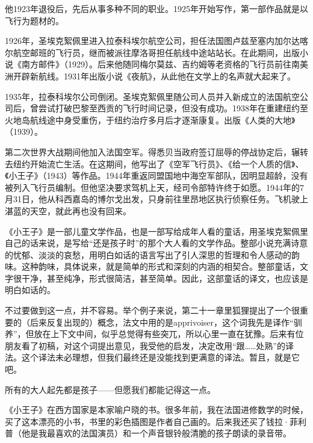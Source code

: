 他1923年退役后，先后从事多种不同的职业。1925年开始写作，第一部作品就是以飞行为题材的。

1926年，圣埃克絮佩里进入拉泰科埃尔航空公司，担任法国图卢兹至塞内加尔达喀尔航空邮班的飞行员，继而被派往摩洛哥担任航线中途站站长。在此期间，出版小说《南方邮件》（1929）。后来他随同梅尔莫兹、吉约姆等老资格的飞行员前往南美洲开辟新航线。1931年出版小说《夜航》，从此他在文学上的名声就大起来了。

1935年，拉泰科埃尔公司倒闭。圣埃克絮佩里随公司人员并入新成立的法国航空公司后，曾尝试打破巴黎至西贡的飞行时间记录，但没有成功。1938年在重建纽约至火地岛航线途中身受重伤，于纽约治疗多月后才逐渐康复。出版《人类的大地》（1939）。

第二次世界大战期间他加入法国空军。得悉贝当政府签订屈辱的停战协定后，辗转去纽约开始流亡生活。在这期间，他写出了《空军飞行员》、《给一个人质的信》、《小王子》（1943）等作品。1944年重返同盟国地中海空军部队，因明显超龄，没有被列入飞行员编制。但他坚决要求驾机上天，经司令部特许终于如愿。1944年的7月31日，他从科西嘉岛的博尔戈出发，只身前往里昂地区执行侦察任务。飞机驶上湛蓝的天空，就此再也没有回来。

《小王子》是一部儿童文学作品，也是一部写给成年人看的童话，用圣埃克絮佩里自己的话来说，是写给“还是孩子时”的那个大人看的文学作品。整部小说充满诗意的忧郁、淡淡的哀愁，用明白如话的语言写出了引人深思的哲理和令人感动的韵味。这种韵味，具体说来，就是简单的形式和深刻的内涵的相契合。整部童话，文字很干净，甚至纯净，形式很简洁，甚至简单。因此，这部童话的译文，也应该是明白如话的。

不过要做到这一点，并不容易。举个例子来说，第二十一章里狐狸提出了一个很重要的（后来反复出现的）概念，法文中用的是apprivoiser，这个词我先是译作“驯养”，但放在上下文中间，似乎总觉得有些突兀，所以心里一直在犹豫。后来有位朋友看了初稿，对这个词提出意见，我受他的启发，决定改用“跟\ldots{}\ldots{}处熟”的译法。这个译法未必理想，但我们最终还是没能找到更满意的译法。暂且，就是它吧。

所有的大人起先都是孩子------但愿我们都能记得这一点。



\stopsubject

\startsubject[title={第二版译序},reference={part0031.html_b002}]

《小王子》在西方国家是本家喻户晓的书。很多年前，我在法国进修数学的时候，买了这本漂亮的小书，书里的彩色插图是作者自己画的。后来我还买了钱拉·菲利普（他是我最喜欢的法国演员）和一个声音银铃般清脆的孩子朗读的录音带。

